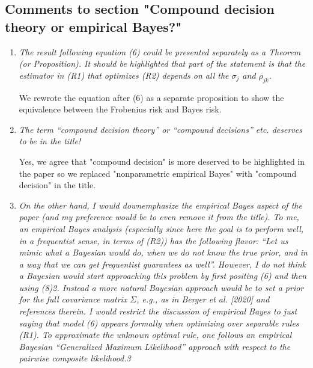 \documentclass[12pt]{article}
\begin{document}
\subsection{Comments to section "Compound decision theory or empirical Bayes?"}
\begin{enumerate}
\item \emph{The result following equation (6) could be presented separately as a Theorem (or Proposition). It should be highlighted that part of the statement is that the estimator in (R1) that optimizes (R2) depends on all the $\sigma_{j}$ and $\rho_{jk}$.}
 
We rewrote the equation after (6) as a separate proposition to show the equivalence between the Frobenius risk and Bayes risk.
\item \emph{The term “compound decision theory” or “compound decisions” etc. deserves to be in the title!}

Yes, we agree that "compound decision" is more deserved to be highlighted in the paper so we replaced "nonparametric empirical Bayes" with "compound decision" in the title.
\item \emph{On the other hand, I would downemphasize the empirical Bayes aspect of the paper (and my preference would be to even remove it from the title). To me, an empirical Bayes analysis (especially since here the goal is to perform well, in a frequentist sense, in terms of (R2)) has the following flavor: “Let us mimic what a Bayesian would do, when we do not know the true prior, and in a way that we can get frequentist guarantees as well”. However, I do not think a Bayesian would start approaching this problem by first positing (6) and then using (8)2. Instead a more natural Bayesian approach would be to set a prior for the full covariance matrix $\Sigma$, e.g., as in Berger et al. [2020] and references therein. I would restrict the discussion of empirical Bayes to just saying that model (6) appears formally when optimizing over separable rules (R1). To approximate the unknown optimal rule, one follows an empirical Bayesian “Generalized Maximum Likelihood” approach with respect to the pairwise composite likelihood.3}
\end{enumerate}
\end{document}
